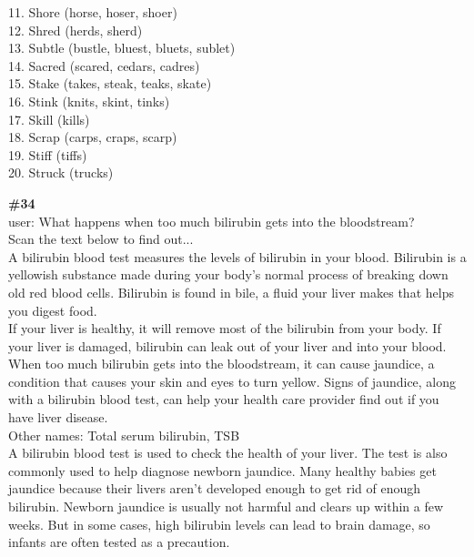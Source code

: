 \documentclass[10pt]{article}
\begin{document}
\begin{Form}
\begin{tcolorbox}[colback=convbg,colframe=itemframe,boxrule=0.8pt,arc=2pt,breakable,left=6pt,right=6pt,top=5pt,bottom=5pt]
{11. Shore (horse, hoser, shoer) \\[2pt]
12. Shred (herds, sherd) \\[2pt]
13. Subtle (bustle, bluest, bluets, sublet) \\[2pt]
14. Sacred (scared, cedars, cadres) \\[2pt]
15. Stake (takes, steak, teaks, skate) \\[2pt]
16. Stink (knits, skint, tinks) \\[2pt]
17. Skill (kills) \\[2pt]
18. Scrap (carps, craps, scarp) \\[2pt]
19. Stiff (tiffs) \\[2pt]
20. Struck (trucks)}
\end{tcolorbox}
\vspace{-1pt}
\CheckBox[name=q33c,width=1.6ex,height=1.6ex,bordercolor={0.45 0.45 0.45}]{~\textcolor{cbox}{COMPACT}}\quad
\CheckBox[name=q33d,width=1.6ex,height=1.6ex,bordercolor={0.45 0.45 0.45}]{~\textcolor{dbox}{DIFFUSE}}\quad
\CheckBox[name=q33n,width=1.6ex,height=1.6ex,bordercolor={0.45 0.45 0.45}]{~\textcolor{nbox}{NONE}}
\vspace{8pt}
\begin{tcolorbox}[colback=convbg,colframe=itemframe,boxrule=0.8pt,arc=2pt,breakable,left=6pt,right=6pt,top=5pt,bottom=5pt]
{\footnotesize\textbf{\#34}}\\[3pt]
{\footnotesize user: What happens when too much bilirubin gets into the bloodstream? \\[2pt]
Scan the text below to find out... \\[2pt]
A bilirubin blood test measures the levels of bilirubin in your blood. Bilirubin is a yellowish substance made during your body's normal process of breaking down old red blood cells. Bilirubin is found in bile, a fluid your liver makes that helps you digest food. \\[2pt]
If your liver is healthy, it will remove most of the bilirubin from your body. If your liver is damaged, bilirubin can leak out of your liver and into your blood. When too much bilirubin gets into the bloodstream, it can cause jaundice, a condition that causes your skin and eyes to turn yellow. Signs of jaundice, along with a bilirubin blood test, can help your health care provider find out if you have liver disease. \\[2pt]
Other names: Total serum bilirubin, TSB \\[2pt]
A bilirubin blood test is used to check the health of your liver. The test is also commonly used to help diagnose newborn jaundice. Many healthy babies get jaundice because their livers aren't developed enough to get rid of enough bilirubin. Newborn jaundice is usually not harmful and clears up within a few weeks. But in some cases, high bilirubin levels can lead to brain damage, so infants are often tested as a precaution. \\[2pt]
}
\end{tcolorbox}
\end{Form}
\end{document}
